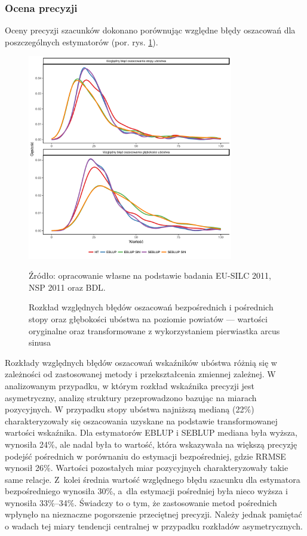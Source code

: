 \subsubsection{Ocena precyzji}

Oceny precyzji szacunków dokonano porównując względne błędy oszacowań dla poszczególnych estymatorów (por. rys. \ref{fig:fh_powiat_prec}). 

\begin{figure}[htp]
\centering
\includegraphics[width=0.8\textwidth]{04_wykresy/fh_pow_prec-1.pdf}
\caption{Rozkład względnych błędów oszacowań bezpośrednich i pośrednich stopy oraz głębokości ubóstwa na poziomie powiatów --- wartości oryginalne oraz transformowane z wykorzystaniem pierwiastka arcus sinusa}
\small{Źródło: opracowanie własne na podstawie badania EU-SILC 2011, NSP 2011 oraz BDL.}
\label{fig:fh_powiat_prec}
\end{figure}

Rozkłady względnych błędów oszacowań wskaźników ubóstwa różnią się w zależności od zastosowanej metody i przekształcenia zmiennej zależnej. W analizowanym przypadku, w którym rozkład wskaźnika precyzji jest asymetryczny, analizę struktury przeprowadzono bazując na miarach pozycyjnych. W przypadku stopy ubóstwa najniższą medianą (22\%) charakteryzowały się oszacowania uzyskane na podstawie transformowanej wartości wskaźnika. Dla estymatorów EBLUP i SEBLUP mediana była wyższa, wynosiła 24\%, ale nadal była to wartość, która wskazywała na większą precyzję podejść pośrednich w porównaniu do estymacji bezpośredniej, gdzie RRMSE wynosił 26\%. Wartości pozostałych miar pozycyjnych charakteryzowały takie same relacje. Z~kolei średnia wartość względnego błędu szacunku dla estymatora bezpośredniego wynosiła 30\%, a~dla estymacji pośredniej była nieco wyższa i wynosiła 33\%--34\%. Świadczy to o tym, że zastosowanie metod pośrednich wpłynęło na nieznaczne pogorszenie przeciętnej precyzji. Należy jednak pamiętać o wadach tej miary tendencji centralnej w przypadku rozkładów asymetrycznych.

